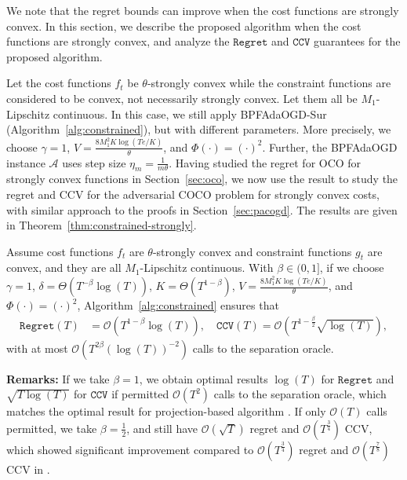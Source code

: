 \documentclass[twoside,11pt,]{article}
\newcommand{\C}[1]{\mathcal{#1}}
\renewcommand{\cite}[1]{\citep{#1}}
\begin{document}
We note that the regret bounds can improve when the cost functions are strongly convex. In this section, we describe the proposed algorithm when the cost functions are strongly convex, and analyze the $\mathtt{Regret}$ and $\mathtt{CCV}$ guarantees for the proposed algorithm. 

Let the cost functions $f_t$ be $\theta$-strongly convex while the constraint functions are considered to be convex, not necessarily strongly convex. Let them all be $M_1$-Lipschitz continuous. 
In this case, we still apply BPFAdaOGD-Sur (Algorithm~\ref{alg:constrained}), but with different parameters. More precisely, we choose \(\gamma = 1\), \(V = \frac{8M_1^2 K \log(Te/K)}{\theta}\), and \(\Phi(\cdot) = (\cdot)^2\). Further, the BPFAdaOGD instance $\C{A}$ uses step size \(\eta_m = \frac{1}{m\theta}\).
Having studied the regret for OCO for strongly convex functions in Section~\ref{sec:oco}, we now use the result to study the regret and CCV for the adversarial COCO problem for strongly convex costs, with similar approach to the proofs in Section~\ref{sec:pacogd}. The results are given in Theorem~\ref{thm:constrained-strongly}.

\begin{theorem}
\label{thm:constrained-strongly}
    Assume cost functions $f_t$ are $\theta$-strongly convex and constraint functions $g_t$ are convex, and they are all $M_1$-Lipschitz continuous.
    With $\beta\in (0,1]$, if we choose $\gamma=1$, $\delta= \Theta( T^{-\beta} \log(T) )$, $K= \Theta(T^{1-\beta})$, $V=\frac{8 M_1^2 K \log(Te/K)}{\theta}$, and $\Phi(\cdot)=(\cdot)^2$,
    Algorithm~\ref{alg:constrained} ensures that
    \begin{align*}
        \mathtt{Regret}(T) &= \C{O}(T^{1-\beta}\log(T)),
        \quad
        \mathtt{CCV}(T) = \C{O}(T^{1-\frac{\beta}{2}}\sqrt{\log(T)}),
    \end{align*}    
    with at most $\C{O}(T^{2\beta}(\log(T))^{-2})$ calls to the separation oracle.
\end{theorem}
\textbf{Remarks:} If we take $\beta=1$, we obtain optimal results $\log(T)$ for $\mathtt{Regret}$ and $\sqrt{T\log(T)}$ for $\mathtt{CCV}$ if permitted $\C{O}(T^2)$ calls to the separation oracle, which matches the optimal result for projection-based algorithm \cite{sinha2024optimal}. If only $\C{O}(T)$ calls permitted, we take $\beta=\frac{1}{2}$, and still have $\C{O}(\sqrt{T})$ regret and $\C{O}(T^{\frac{3}{4}})$ CCV, which showed significant improvement compared to $\C{O}(T^\frac{3}{4})$ regret and $\C{O}(T^{\frac{7}{8}})$ CCV in \cite{garber2024projection}. 
\end{document}
